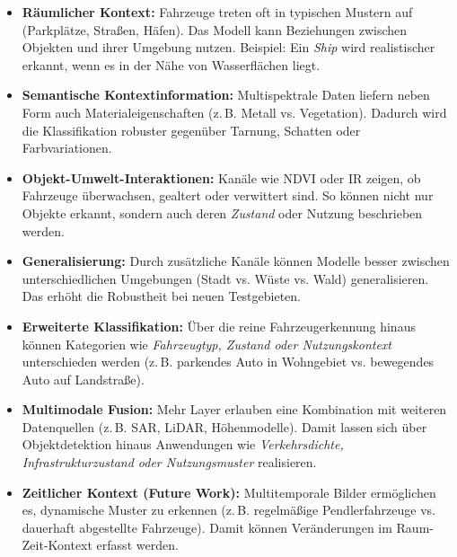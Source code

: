 \begin{itemize}
    \item \textbf{Räumlicher Kontext:} 
    Fahrzeuge treten oft in typischen Mustern auf (Parkplätze, Straßen, Häfen). 
    Das Modell kann Beziehungen zwischen Objekten und ihrer Umgebung nutzen. 
    Beispiel: Ein \emph{Ship} wird realistischer erkannt, wenn es in der Nähe von Wasserflächen liegt.

    \item \textbf{Semantische Kontextinformation:} 
    Multispektrale Daten liefern neben Form auch Materialeigenschaften (z.\,B. Metall vs. Vegetation). 
    Dadurch wird die Klassifikation robuster gegenüber Tarnung, Schatten oder Farbvariationen.

    \item \textbf{Objekt-Umwelt-Interaktionen:} 
    Kanäle wie NDVI oder IR zeigen, ob Fahrzeuge überwachsen, gealtert oder verwittert sind. 
    So können nicht nur Objekte erkannt, sondern auch deren \emph{Zustand} oder Nutzung beschrieben werden.

    \item \textbf{Generalisierung:} 
    Durch zusätzliche Kanäle können Modelle besser zwischen unterschiedlichen Umgebungen 
    (Stadt vs. Wüste vs. Wald) generalisieren. 
    Das erhöht die Robustheit bei neuen Testgebieten.

    \item \textbf{Erweiterte Klassifikation:} 
    Über die reine Fahrzeugerkennung hinaus können Kategorien wie 
    \emph{Fahrzeugtyp, Zustand oder Nutzungskontext} unterschieden werden 
    (z.\,B. parkendes Auto in Wohngebiet vs. bewegendes Auto auf Landstraße).

    \item \textbf{Multimodale Fusion:} 
    Mehr Layer erlauben eine Kombination mit weiteren Datenquellen 
    (z.\,B. SAR, LiDAR, Höhenmodelle). 
    Damit lassen sich über Objektdetektion hinaus Anwendungen wie 
    \emph{Verkehrsdichte, Infrastrukturzustand oder Nutzungsmuster} realisieren.

    \item \textbf{Zeitlicher Kontext (Future Work):} 
    Multitemporale Bilder ermöglichen es, dynamische Muster zu erkennen 
    (z.\,B. regelmäßige Pendlerfahrzeuge vs. dauerhaft abgestellte Fahrzeuge). 
    Damit können Veränderungen im Raum-Zeit-Kontext erfasst werden.
\end{itemize}

